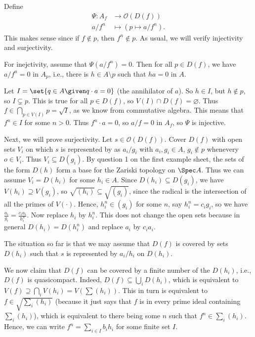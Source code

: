 Define
\begin{align*}
	\Psi\colon A_f&\to \mathcal{O}(D(f))\\
	a/f^n&\mapsto (p\mapsto a/f^n).
\end{align*}
This makes sense since if $f\notin p$, then $f^n\notin p$.
As usual, we will verify injectivity and surjectivity.

For inejctivity, assume that $\Psi(a/f^n) = 0$. Then for all $p \in D(f)$, we have
$a/f^n = 0$ in $A_p$, i.e., there is  $h \in A\setminus p$ such that $ha = 0$ in $A$.

Let $I = \set{q \in A\given q\cdot a = 0}$ (the annihilator of $a$).
So $h \in I$, but $h \notin p$, so $I\subsetneq p$.
This is true for all $p \in D(f)$, so $V(I)\cap D(f) = \varnothing$. Thus
$f \in \bigcap_{p \in V(I)}p = \sqrt{I}$, as we know from commutative algebra.
This means that $f^n \in I$ for some $n>0$. Thus $f^n\cdot a = 0$, so
$a/f = 0$ in $A_f$, so $\Psi$ is injective.

Next, we will prove surjectivity. Let $s \in \mathcal{O}(D(f))$. Cover
$D(f)$ with open sets $V_i$ on which $s$ is represented by as $a_i/g_i$ with
$a_i, g_i \in A$, $g_i \notin p$ whenevery $o \in V_i$. Thus $V_i \subseteq D(g_i)$.
By question 1 on the first example sheet, the sets of the form $D(h)$ form a
base for the Zariski topology on $\Spec A$. Thus we can assume $V_i = D(h_i)$
for some $h_i \in A$. Since $D(h_i) \subseteq D(g_i)$, we have
$V(h_i) \supseteq V(g_i)$, so $\sqrt{(h_i)} \subseteq \sqrt{(g_i)}$, since the
radical is the intersection of all the primes of $V(\cdot)$. Hence,
$h_i^n \in (g_i)$ for some $n$, say $h_i^n = c_ig_i$, so we have
$\frac{a_i}{g_i} = \frac{c_ia_i}{h_i^n}$. Now replace $h_i$ by $h_i^n$. This does
not change the open sets because in general $D(h_i) = D(h_i^n)$ and replace
$a_i$ by $c_ia_i$.

The situation so far is that we may assume that $D(f)$ is covered by sets
$D(h_i)$ such that $s$ is represented by $a_i/h_i$ on $D(h_i)$.

We now claim that $D(f)$ can be covered by a finite number of the  $D(h_i)$, i.e.,
$D(f)$ is quasicompact. Indeed, $D(f) \subseteq \bigcup_i D(h_i)$, which is equivalent
to $V(f) \supseteq \bigcap_i V(h_i) = V(\sum (h_i))$. This in turn is equivalent to
$f \in \sqrt{\sum_i (h_i)}$ (because it just says that $f$ is in every prime ideal
containing $\sum_i (h_i)$), which is equivalent to there being some $n$ such that
$f^n \in \sum_i (h_i)$. Hence, we can write $f^n = \sum_{i \in I} b_i h_i$ for some finite
set $I$.

